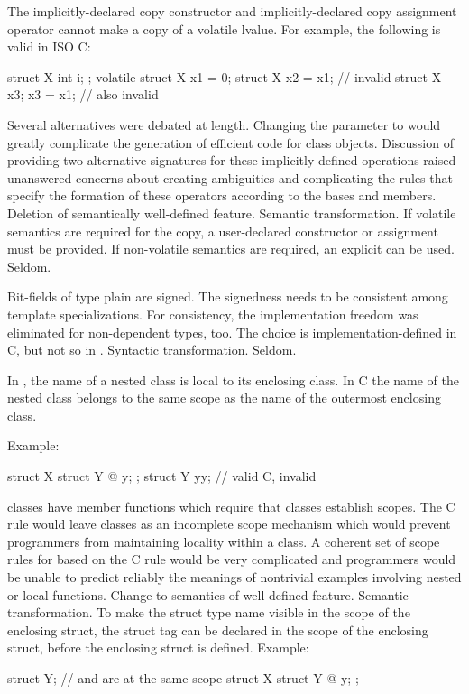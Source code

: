 The implicitly-declared copy constructor and
implicitly-declared copy assignment operator
cannot make a copy of a volatile lvalue.
For example, the following is valid in ISO C:
\begin{codeblock}
struct X { int i; };
volatile struct X x1 = {0};
struct X x2 = x1;               // invalid \Cpp{}
struct X x3;
x3 = x1;                        // also invalid \Cpp{}
\end{codeblock}

\rationale
Several alternatives were debated at length.
Changing the parameter to
would greatly complicate the generation of
efficient code for class objects.
Discussion of
providing two alternative signatures for these
implicitly-defined operations raised
unanswered concerns about creating
ambiguities and complicating
the rules that specify the formation of
these operators according to the bases and
members.
\effect
Deletion of semantically well-defined feature.
\difficulty
Semantic transformation.
If volatile semantics are required for the copy,
a user-declared constructor or assignment must
be provided.
If non-volatile semantics are required,
an explicit
can be used.
\howwide
Seldom.

\change
{}%
Bit-fields of type plain  are signed.
\rationale
The signedness needs to be consistent among template specializations.
For consistency,
the implementation freedom was eliminated for non-dependent types,
too.
\effect
The choice is implementation-defined in C, but not so in \Cpp{}.
\difficulty
Syntactic transformation.
\howwide
Seldom.

\change
In \Cpp{}, the name of a nested class is local to its enclosing class. In C
the name of the nested class belongs to the same scope as the name of the outermost enclosing class.

Example:
\begin{codeblock}
struct X {
  struct Y { @\commentellip@ } y;
};
struct Y yy;                    // valid C, invalid \Cpp{}
\end{codeblock}
\rationale
\Cpp{} classes have member functions which require that classes
establish scopes.
The C rule would leave classes as an incomplete scope mechanism
which would prevent \Cpp{} programmers from maintaining locality
within a class.
A coherent set of scope rules for \Cpp{} based on the C rule would
be very complicated and \Cpp{} programmers would be unable to predict
reliably the meanings of nontrivial examples involving nested or
local functions.
\effect
Change to semantics of well-defined feature.
\difficulty
Semantic transformation.
To make the struct type name visible in the scope of the enclosing
struct, the struct tag can be declared in the scope of the
enclosing struct, before the enclosing struct is defined.
Example:
\begin{codeblock}
struct Y;                       //  and  are at the same scope
struct X {
  struct Y { @\commentellip@ } y;
};
\end{codeblock}

